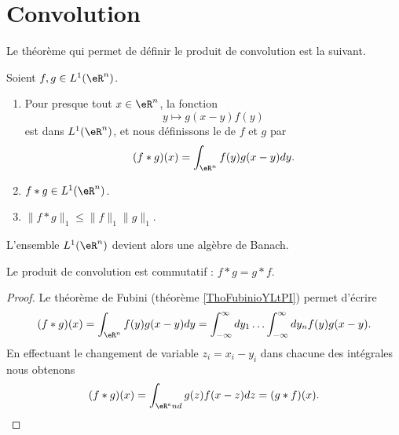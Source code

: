 \section{Convolution}

Le théorème qui permet de définir le produit de convolution est la suivant.

\begin{theorem}
    Soient \( f,g\in L^1(\eR^n)\). 
    \begin{enumerate}
        \item
            Pour presque tout \( x\in \eR^n\), la fonction
            \begin{equation}
                y\mapsto g(x-y)f(y)
            \end{equation}
            est dans \( L^1(\eR^n)\), et nous définissons le  de \( f\) et \( g\) par
            \begin{equation}
                (f*g)(x)=\int_{\eR^n} f(y)g(x-y)dy.
            \end{equation}
        \item
            \( f*g\in L^1(\eR^n)\).
        \item
            \( \| f*g \|_1\leq \| f \|_1\| g \|_1\).
    \end{enumerate}
\end{theorem}

L'ensemble \( L^1(\eR^n)\) devient alors une algèbre de Banach.

\begin{lemma}
    Le produit de convolution est commutatif : \( f*g=g*f\).
\end{lemma}

\begin{proof}
    Le théorème de Fubini (théorème \ref{ThoFubinioYLtPI}) permet d'écrire
    \begin{equation}
        (f*g)(x)=\int_{\eR^n}f(y)g(x-y)dy=\int_{-\infty}^{\infty}dy_1\ldots \int_{-\infty}^{\infty}dy_nf(y)g(x-y).
    \end{equation}
    En effectuant le changement de variable \( z_i=x_i-y_i\) dans chacune des intégrales nous obtenons
    \begin{equation}
        (f*g)(x)=\int_{\eR^end}g(z)f(x-z)dz=(g*f)(x).
    \end{equation}
\end{proof}
